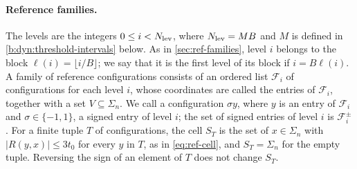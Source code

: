 \paragraph{Reference families.} The levels are the integers $0\le i<N_{\rm lev}$, where $N_{\rm lev}=MB$ and $M$ is defined in \eqref{b:dyn:threshold-intervals} below. As in \cref{sec:ref-families}, level $i$ belongs to the block ${\ell}(i)=\lfloor i/B\rfloor$; we say that it is the first level of its block if $i=B\ell(i)$. A family of reference configurations consists of an ordered list $\mathcal F_i$ of configurations for each level $i$, whose coordinates are called the entries of $\mathcal F_i$, together with a set $V\subseteq\Sigma_n$. We call a configuration $\sigma y$, where $y$ is an entry of $\mathcal F_i$ and $\sigma\in\{-1,1\}$, a signed entry of level $i$; the set of signed entries of level $i$ is $\mathcal F_i^\pm$. For a finite tuple $T$ of configurations, the cell $S_T$ is the set of $x\in\Sigma_n$ with $|R(y,x)|\le3t_0$ for every $y$ in $T$, as in \eqref{eq:ref-cell}, and $S_T=\Sigma_n$ for the empty tuple. Reversing the sign of an element of $T$ does not change $S_T$.

